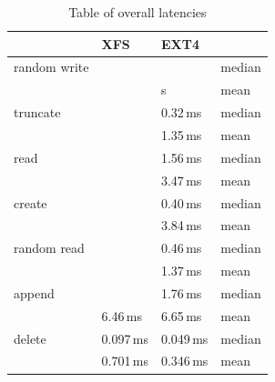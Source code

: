 \documentclass[
  color, %
  table, %
  lof,   %
  lot,   %
]{fithesis3}
\begin{document}
\begin{table}[htb]
\centering
\caption{Table of overall latencies}
\begin{tabular}{|l|l|l|l|}
\hline
 &XFS & EXT4 &  \\
\hline
    random write & & & median \\
 \hline
                 &  & s & mean\\
    \hline
        truncate &  & 0.32\,ms & median\\
    \hline
                 &  & 1.35\,ms& mean \\
    \hline
            read &  & 1.56\,ms & median\\
    \hline
                 &  & 3.47\,ms & mean \\
    \hline
          create &  & 0.40\,ms & median\\
    \hline
                 &  & 3.84\,ms & mean \\
    \hline
     random read &  & 0.46\,ms & median\\
    \hline
                 &  & 1.37\,ms & mean \\
    \hline
          append &  & 1.76\,ms & median\\
    \hline
                 & 6.46\,ms & 6.65\,ms & mean \\
    \hline
          delete & 0.097\,ms & 0.049\,ms & median\\
    \hline
                & 0.701\,ms & 0.346\,ms & mean \\
    \hline
\end{tabular}
\label{empty}
\end{table}
\end{document}
